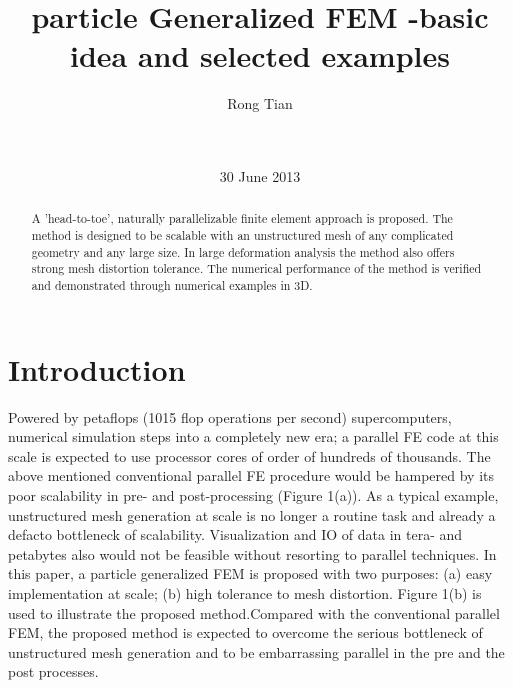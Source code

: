 \documentclass{acm_proc_article-sp}
\begin{document}
\title{particle Generalized FEM
-basic idea and selected examples}

%
\author{
\alignauthor
Rong Tian\\
       \\
       \\
}
\date{30 June 2013}

\maketitle

\begin{abstract}
A 'head-to-toe', naturally parallelizable finite element approach is proposed. The method is designed to be scalable with an unstructured mesh of any complicated geometry and any large size.
In large deformation analysis the method also offers strong mesh distortion tolerance. The
numerical performance of the method is verified and demonstrated through numerical examples in 3D.
\end{abstract}



\section{Introduction}
Powered by petaflops (1015 flop operations per second) supercomputers, numerical simulation steps into a completely new era; a parallel FE code at this scale is expected to use processor cores of order of hundreds of thousands. The above mentioned conventional parallel FE procedure would be hampered by its poor scalability in pre- and post-processing (Figure 1(a)). As a typical example, unstructured mesh generation at scale is no longer a routine task and already a defacto bottleneck of scalability. Visualization and IO of data in tera- and petabytes also would not be feasible without resorting to parallel techniques\cite{rongtian:method}.
In this paper, a particle generalized FEM is proposed with two purposes: (a) easy implementation at scale; (b) high tolerance to mesh distortion. Figure 1(b) is used to illustrate the proposed method.Compared with the conventional parallel FEM, the proposed method is expected to overcome the serious bottleneck of unstructured mesh generation and to be embarrassing parallel in the pre and the post processes.
\end{document}
